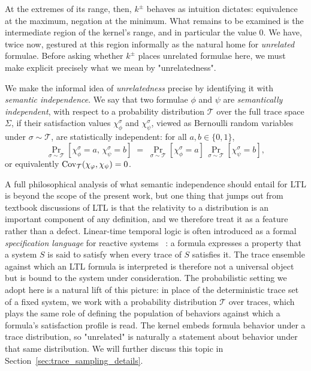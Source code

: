 \documentclass[titlepage,a4paper,11pt]{report}
\begin{document}
    At the extremes of its range, then, $k^\pm$ behaves as intuition dictates: equivalence at the maximum, negation at the minimum. What remains to be examined is the intermediate region of the kernel's range, and in particular the value $0$. We have, twice now, gestured at this region informally as the natural home for \emph{unrelated} formulae. Before asking whether $k^\pm$ places unrelated formulae here, we must make explicit precisely what we mean by "unrelatedness".
    
    We make the informal idea of \emph{unrelatedness} precise by identifying it with \emph{semantic independence}. We say that two formulae $\phi$ and $\psi$ are \emph{semantically independent}, with respect to a probability distribution $\mathcal{T}$ over the full trace space $\Sigma$, if their satisfaction values $\chi^\sigma_\phi$ and $\chi^\sigma_\psi$, viewed as Bernoulli random variables under $\sigma \sim \mathcal{T}$, are statistically independent: for all $a, b \in \{0, 1\}$,
    \begin{equation}
        \Pr_{\sigma \sim \mathcal{T}}[\chi^\sigma_\phi = a,\, \chi^\sigma_\psi = b]
        \;=\;
        \Pr_{\sigma \sim \mathcal{T}}[\chi^\sigma_\phi = a]\,
        \Pr_{\sigma \sim \mathcal{T}}[\chi^\sigma_\psi = b],
    \end{equation}
    or equivalently $\mathrm{Cov}_{\mathcal{T}}(\chi_\varphi, \chi_\psi) = 0$.
    
    A full philosophical analysis of what semantic independence should entail for LTL is beyond the scope of the present work, but one thing that jumps out from textbook discussions of LTL is that the relativity to a distribution is an important component of any definition, and we therefore treat it as a feature rather than a defect. Linear-time temporal logic is often introduced as a formal \emph{specification language} for reactive systems ~\citep{baier_principles_2008}: a formula expresses a property that a system $S$ is said to satisfy when every trace of $S$ satisfies it. The trace ensemble against which an LTL formula is interpreted is therefore not a universal object but is bound to the system under consideration. The probabilistic setting we adopt here is a natural lift of this picture: in place of the deterministic trace set of a fixed system, we work with a probability distribution $\mathcal{T}$ over traces, which plays the same role of defining the population of behaviors against which a formula's satisfaction profile is read. The kernel embeds formula behavior under a trace distribution, so "unrelated" is naturally a statement about behavior under that same distribution. We will further discuss this topic in Section~\ref{sec:trace_sampling_details}. 
    
\end{document}
